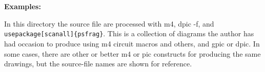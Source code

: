 \documentclass[11pt]{article}
\begin{document}
  \hfill
  {\large\bf Examples:
    
    }
  \hfill\break

  In this directory the source file are processed with m4, dpic -f,
  and {\tt{} usepackage[scanall]\{psfrag\}}.
  This is a collection of diagrams the author has had occasion to
  produce using m4 circuit macros and others, and gpic or dpic.  In
  some cases, there are other or better m4 or pic constructs for
  producing the same drawings, but the source-file names are shown for
  reference.


\end{document}
